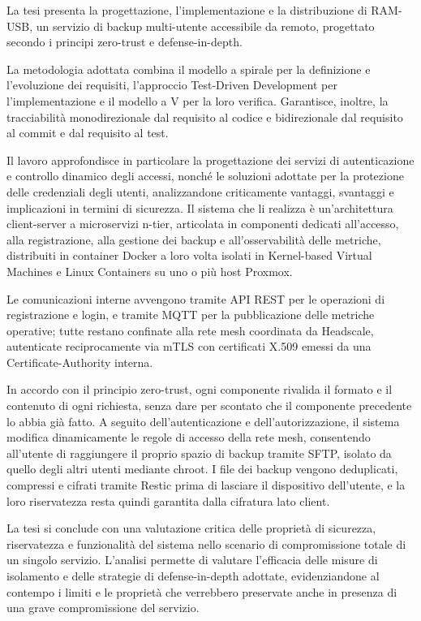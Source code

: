 \abstract
La tesi presenta la progettazione, l'implementazione e la distribuzione di RAM-USB,
un servizio di backup multi-utente accessibile da remoto, progettato secondo i principi zero-trust e
defense-in-depth.

La metodologia adottata combina il modello a spirale per la definizione e l'evoluzione dei requisiti, 
l'approccio Test-Driven Development per l'implementazione e il modello a V per la loro verifica. 
Garantisce, inoltre, la tracciabilità monodirezionale dal requisito al codice e bidirezionale dal requisito
al commit e dal requisito al test.

Il lavoro approfondisce in particolare la progettazione dei servizi di autenticazione e controllo dinamico
degli accessi, nonché le soluzioni adottate per la protezione delle credenziali degli utenti, analizzandone
criticamente vantaggi, svantaggi e implicazioni in termini di sicurezza. Il sistema che li realizza è
un'architettura client-server a microservizi n-tier, articolata in componenti dedicati all'accesso, alla
registrazione, alla gestione dei backup e all'osservabilità delle metriche, distribuiti in container Docker
a loro volta isolati in Kernel-based Virtual Machines e Linux Containers su uno o più host Proxmox.

Le comunicazioni interne avvengono tramite API REST per le operazioni di registrazione e login, e tramite 
MQTT per la pubblicazione delle metriche operative; tutte restano confinate alla rete mesh coordinata da 
Headscale, autenticate reciprocamente via mTLS con certificati X.509 emessi da una Certificate-Authority 
interna.

In accordo con il principio zero-trust, ogni componente rivalida il formato e il contenuto
di ogni richiesta, senza dare per scontato che il componente precedente lo abbia già fatto. A seguito
dell'autenticazione e dell'autorizzazione, il sistema modifica dinamicamente le regole di accesso della rete
mesh, consentendo all'utente di raggiungere il proprio spazio di backup tramite SFTP, isolato da quello
degli altri utenti mediante chroot. I file dei backup vengono deduplicati, compressi e cifrati tramite
Restic prima di lasciare il dispositivo dell'utente, e la loro riservatezza resta quindi garantita dalla
cifratura lato client.

La tesi si conclude con una valutazione critica delle proprietà di sicurezza, riservatezza e funzionalità
del sistema nello scenario di compromissione totale di un singolo servizio. L'analisi permette di valutare
l'efficacia delle misure di isolamento e delle strategie di defense-in-depth adottate, evidenziandone al
contempo i limiti e le proprietà che verrebbero preservate anche in presenza di una grave compromissione
del servizio.

